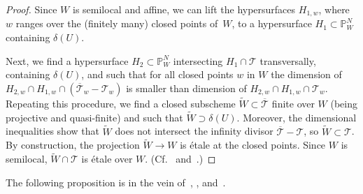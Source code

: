 \documentclass[11pt]{amsart}
\renewcommand\P{\mathbb P}
\theoremstyle{plain}
\theoremstyle{definition}
\theoremstyle{remark}
\newcommand\cT{{\mathcal{T}}}
\begin{document}
\begin{proof}
Since $W$ is semilocal and affine, we can lift the hypersurfaces $H_{1,w}$, where $w$ ranges over the (finitely many) closed points of~$W$, to a hypersurface $H_1\subset\P_W^N$ containing $\delta(U)$.

Next, we find a hypersurface $H_2\subset\P_W^N$ intersecting $H_1\cap\cT$ transversally, containing $\delta(U)$, and such that for all closed points $w$ in $W$ the dimension of $H_{2,w}\cap H_{1,w}\cap(\overline\cT_w-\cT_w)$ is smaller than dimension of $H_{2,w}\cap H_{1,w}\cap\cT_w$. Repeating this procedure, we find a closed subscheme $\widetilde W\subset\overline\cT$ finite over $W$ (being projective and quasi-finite) and such that $\widetilde W\supset\delta(U)$. Moreover, the dimensional inequalities show that $\widetilde W$ does not intersect the infinity divisor $\overline\cT-\cT$, so $\widetilde W\subset\cT$. By construction, the projection $\widetilde W\to W$ is \'etale at the closed points. Since $W$ is semilocal, $\widetilde W\cap\cT$ is \'etale over $W$. (Cf.~\cite[Prop.~4.1]{FedorovPanin} and~\cite[Lm.~4.3]{PaninNiceTriples}.)
\end{proof}

The following proposition is in the vein of~\cite[Prop.~5.1]{PaninStavrovaVavilov}, \cite[Thm.~4.1]{PaninNiceTriples}, and~\cite[Lm.~5.1]{CesnaviciusGrSerre}.
\end{document}

